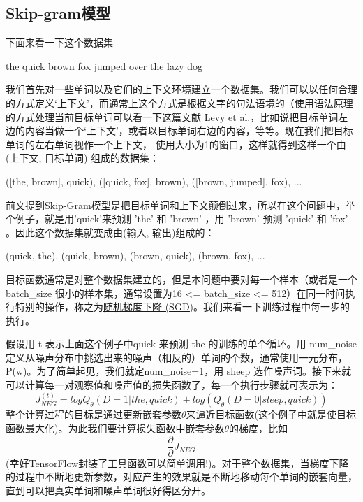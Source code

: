 \subsection{Skip-gram模型}
下面来看一下这个数据集

the quick brown fox jumped over the lazy dog

我们首先对一些单词以及它们的上下文环境建立一个数据集。我们可以以任何合理的方式定义‘上下文’，而通常上这个方式是根据文字的句法语境的（使用语法原理的方式处理当前目标单词可以看一下这篇文献 \href{https://levyomer.files.wordpress.com/2014/04/dependency-based-word-embeddings-acl-2014.pdf}{Levy et al.}，比如说把目标单词左边的内容当做一个‘上下文’，或者以目标单词右边的内容，等等。现在我们把目标单词的左右单词视作一个上下文， 使用大小为1的窗口，这样就得到这样一个由(上下文, 目标单词) 组成的数据集：

([the, brown], quick), ([quick, fox], brown), ([brown, jumped], fox), ...

前文提到Skip-Gram模型是把目标单词和上下文颠倒过来，所以在这个问题中，举个例子，就是用'quick'来预测 'the' 和 'brown' ，用 'brown' 预测 'quick' 和 'fox' 。因此这个数据集就变成由(输入, 输出)组成的：

(quick, the), (quick, brown), (brown, quick), (brown, fox), ...

目标函数通常是对整个数据集建立的，但是本问题中要对每一个样本（或者是一个batch\_size 很小的样本集，通常设置为16 <= batch\_size <= 512）在同一时间执行特别的操作，称之为\href{https://en.wikipedia.org/wiki/Stochastic_gradient_descent}{随机梯度下降 (SGD)}。我们来看一下训练过程中每一步的执行。

假设用 t 表示上面这个例子中quick 来预测 the 的训练的单个循环。用 num\_noise 定义从噪声分布中挑选出来的噪声（相反的）单词的个数，通常使用一元分布，P(w)。为了简单起见，我们就定num\_noise=1，用 sheep 选作噪声词。接下来就可以计算每一对观察值和噪声值的损失函数了，每一个执行步骤就可表示为：
\begin{equation*}
J_{NEG}^{(t)}=logQ_{\theta}(D=1|the,quick)+log(Q_{\theta}(D=0|sleep,quick))
\end{equation*}
整个计算过程的目标是通过更新嵌套参数$\theta$来逼近目标函数(这个例子中就是使目标函数最大化)。为此我们要计算损失函数中嵌套参数$\theta$的梯度，比如\[\frac{\partial}{\partial}J_{NEG}\]
(幸好TensorFlow封装了工具函数可以简单调用!)。对于整个数据集，当梯度下降的过程中不断地更新参数，对应产生的效果就是不断地移动每个单词的嵌套向量，直到可以把真实单词和噪声单词很好得区分开。

